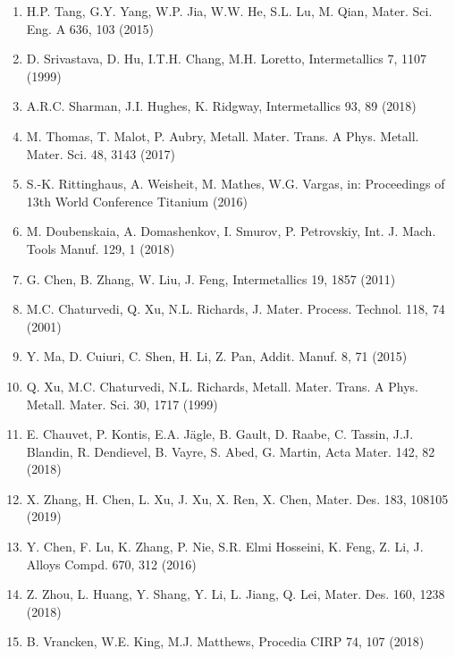 \documentclass[10pt]{article}
\begin{document}
\begin{enumerate}
  \item H.P. Tang, G.Y. Yang, W.P. Jia, W.W. He, S.L. Lu, M. Qian, Mater. Sci. Eng. A 636, 103 (2015)

  \item D. Srivastava, D. Hu, I.T.H. Chang, M.H. Loretto, Intermetallics 7, 1107 (1999)

  \item A.R.C. Sharman, J.I. Hughes, K. Ridgway, Intermetallics 93, 89 (2018)

  \item M. Thomas, T. Malot, P. Aubry, Metall. Mater. Trans. A Phys. Metall. Mater. Sci. 48, 3143 (2017)

  \item S.-K. Rittinghaus, A. Weisheit, M. Mathes, W.G. Vargas, in: Proceedings of 13th World Conference Titanium (2016)

  \item M. Doubenskaia, A. Domashenkov, I. Smurov, P. Petrovskiy, Int. J. Mach. Tools Manuf. 129, 1 (2018)

  \item G. Chen, B. Zhang, W. Liu, J. Feng, Intermetallics 19, 1857 (2011)

  \item M.C. Chaturvedi, Q. Xu, N.L. Richards, J. Mater. Process. Technol. 118, 74 (2001)

  \item Y. Ma, D. Cuiuri, C. Shen, H. Li, Z. Pan, Addit. Manuf. 8, 71 (2015)

  \item Q. Xu, M.C. Chaturvedi, N.L. Richards, Metall. Mater. Trans. A Phys. Metall. Mater. Sci. 30, 1717 (1999)

  \item E. Chauvet, P. Kontis, E.A. Jägle, B. Gault, D. Raabe, C. Tassin, J.J. Blandin, R. Dendievel, B. Vayre, S. Abed, G. Martin, Acta Mater. 142, 82 (2018)

  \item X. Zhang, H. Chen, L. Xu, J. Xu, X. Ren, X. Chen, Mater. Des. 183, 108105 (2019)

  \item Y. Chen, F. Lu, K. Zhang, P. Nie, S.R. Elmi Hosseini, K. Feng, Z. Li, J. Alloys Compd. 670, 312 (2016)

  \item Z. Zhou, L. Huang, Y. Shang, Y. Li, L. Jiang, Q. Lei, Mater. Des. 160, 1238 (2018)

  \item B. Vrancken, W.E. King, M.J. Matthews, Procedia CIRP 74, 107 (2018)


\end{enumerate}
\end{document}
